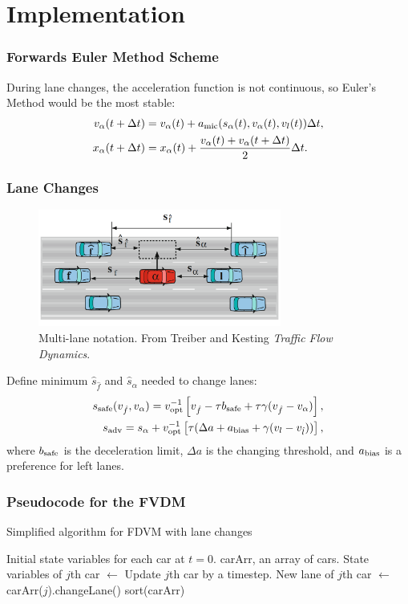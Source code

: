 \documentclass{beamer}
\begin{document}
\section{Implementation}
\begin{frame}
  \frametitle{Forwards Euler Method Scheme}
  During lane changes, the acceleration function is not continuous, so Euler's Method would be the most stable:
  \begin{align*}
    v_\alpha(t+\Delta t) &= v_\alpha(t) +a_{\rm mic}(s_\alpha(t), v_\alpha (t), v_l (t))\Delta t, \\
    x_\alpha(t + \Delta t) &= x_\alpha(t) + \frac{v_\alpha (t) + v_\alpha (t+\Delta t)}{2}\Delta t.
\end{align*}
\end{frame}

\begin{frame}
  \frametitle{Lane Changes}
  \begin{figure}[H]
    \includegraphics[width=8cm]{lane_change_diagram.PNG}
    \centering
    \caption{Multi-lane notation. From Treiber and Kesting \textit{Traffic Flow Dynamics}.}
\end{figure}
  Define minimum $\hat s_{\hat f}$ and $\hat s_{\alpha}$ needed to change lanes: 
  \begin{align*}
    s_{\rm safe} (v_{\hat f}, v_{\alpha}) = v_{\rm opt}^{-1} \left[v_{\hat f} -\tau b_{\rm safe} + \tau \gamma (v_{\hat f} - v_{\alpha}) \right],\\
    s_{\rm adv} = s_{\alpha} + v_{\rm opt}^{-1} \left[\tau(\Delta a + a_{\rm bias} + \gamma(v_l - v_{\hat l}))\right],
  \end{align*}
  where $b_{\rm safe}$ is the  deceleration limit, $\Delta a$ is the changing threshold, and $a_{\rm bias}$ is a preference for left lanes. 
\end{frame}

\begin{frame}
  \frametitle{Pseudocode for the FVDM}
  \begin{algorithm}
    \caption{Simplified algorithm for FDVM with lane changes}\label{alg:car-following-lane}
    \begin{algorithmic}
    \Require Initial state variables for each car at $t=0$. 
    \Require carArr, an array of cars.
      \State State variables of $j$th car $\gets$ Update $j$th car by a timestep.
      \State New lane of $j$th car $\gets$ carArr($j$).changeLane()
      \EndFor
      \State sort(carArr)
    \EndFor
    \end{algorithmic}
    \end{algorithm}
\end{frame}
\end{document}
